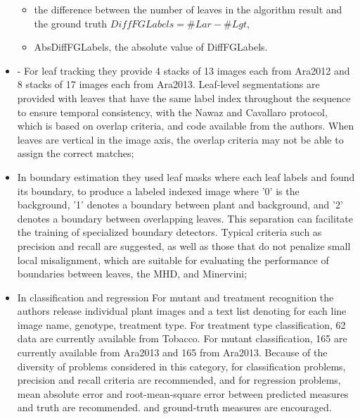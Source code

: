 \begin{itemize}
\begin{itemize}
\item the difference between the number of leaves in the algorithm result and the ground truth $DiffFGLabels = \#Lar - \#Lgt$,
\item AbsDiffFGLabels, the absolute value of DiffFGLabels.
\end{itemize}
\item - For leaf tracking they provide 4 stacks of 13 images each from Ara2012 and 8 stacks of 17 images each from Ara2013. Leaf-level segmentations are provided
with leaves that have the same label index throughout the sequence to ensure temporal consistency, with the Nawaz and Cavallaro protocol, which is based on overlap
criteria, and code available from the authors. When leaves are vertical in the image axis, the overlap criteria may not be able to assign the correct matches;
\item In boundary estimation they used leaf masks where each leaf labels and found its boundary, to produce a labeled indexed image where '0' is the background,
'1' denotes a boundary between plant and background, and '2' denotes a boundary between overlapping leaves. This separation can facilitate the training of specialized
boundary detectors. Typical criteria such as precision and recall are suggested, as well as those that do not penalize small local misalignment, which are suitable for
evaluating the performance of boundaries between leaves, the MHD, and Minervini;
\item In classification and regression For mutant and treatment recognition the authors release individual plant images and a text list denoting for each line image name,
genotype, treatment type. For treatment type classification, 62 data are currently available from Tobacco. For mutant classification, 165 are currently available
from Ara2013 and 165 from Ara2013. Because of the diversity of problems considered in this category, for classification problems, precision and recall criteria are
recommended, and for regression problems, mean absolute error and root-mean-square error between predicted measures and truth are recommended. and ground-truth measures
are encouraged.
\end{itemize}

